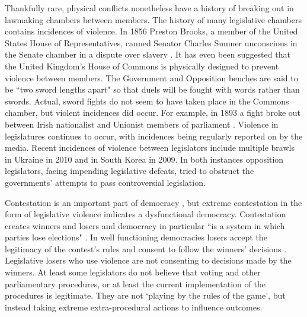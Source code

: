\documentclass[a4paper]{article}\usepackage{graphicx, color}
\begin{document}
Thankfully rare, physical conflicts nonetheless have a history of breaking out in lawmaking chambers between members. The history of many legislative chambers contains incidences of violence. In 1856 Preston Brooks, a member of the United States House of Representatives, canned Senator Charles Sumner unconscious in the Senate chamber in a dispute over slavery \citep{USSenateCanning}. It has even been suggested that the United Kingdom's House of Commons is physically designed to prevent violence between members. The Government and Opposition benches are said to be ``two sword lengths apart" \citep{ParliamentUKSword} so that duels will be fought with words rather than swords. Actual, sword fights do not seem to have taken place in the Commons chamber, but violent incidences did occur. For example, in 1893 a fight broke out between Irish nationalist and Unionist members of parliament \citep{ByrneViolence}. Violence in legislatures continues to occur, with incidences being regularly reported on by the media. Recent incidences of violence between legislators include multiple brawls in Ukraine in 2010 and in South Korea in 2009. In both instances opposition legislators, facing impending legislative defeats, tried to obstruct the governments' attempts to pass controversial legislation. 

Contestation is an important part of democracy \citep{Alvarez1996, Dahl1971, Follesdal2006}, but extreme contestation in the form of legislative violence indicates a dysfunctional democracy. Contestation creates winners and losers and democracy in particular ``is a system in which parties lose elections" \citep[][10]{Przeworski1991}.  In well functioning democracies losers accept the legitimacy of the contest's rules \citep[][553]{Nadeau1993} and consent to follow the winners' decisions \citep[][]{Anderson2005}. Legislative losers who use violence are not consenting to decisions made by the winners. At least some legislators do not believe that voting and other parliamentary procedures, or at least the current implementation of the procedures is legitimate. They are not `playing by the rules of the game', but instead taking extreme extra-procedural actions to influence outcomes. 
\end{document}
